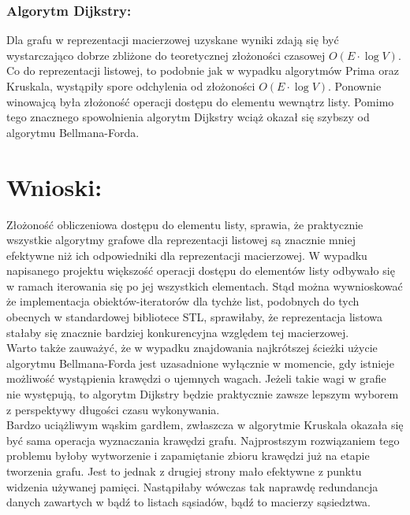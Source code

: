 \documentclass[a4paper,12pt]{article}
\begin{document}
\subsubsection{Algorytm Dijkstry:}
Dla grafu w reprezentacji macierzowej uzyskane wyniki zdają się być wystarczająco dobrze zbliżone do teoretycznej złożoności czasowej $O(E \cdot \log V)$. \\

\noindent
Co do reprezentacji listowej, to podobnie jak w wypadku algorytmów Prima oraz Kruskala, wystąpiły spore odchylenia od złożoności $O(E \cdot \log V)$. Ponownie winowajcą była złożoność operacji dostępu do elementu wewnątrz listy. Pomimo tego znacznego spowolnienia algorytm Dijkstry wciąż okazał się szybszy od algorytmu Bellmana-Forda.

\section{Wnioski:}
Złożoność obliczeniowa dostępu do elementu listy, sprawia, że praktycznie wszystkie algorytmy grafowe dla reprezentacji listowej są znacznie mniej efektywne niż ich odpowiedniki dla reprezentacji macierzowej. W wypadku napisanego projektu większość operacji dostępu do elementów listy odbywało się w ramach iterowania się po jej wszystkich elementach. Stąd można wywnioskować że implementacja obiektów-iteratorów dla tychże list, podobnych do tych obecnych w standardowej bibliotece STL, sprawiłaby, że reprezentacja listowa stałaby się znacznie bardziej konkurencyjna względem tej macierzowej.\\

\noindent
Warto także zauważyć, że w wypadku znajdowania najkrótszej ścieżki użycie algorytmu Bellmana-Forda jest uzasadnione wyłącznie w momencie, gdy istnieje możliwość wystąpienia krawędzi o ujemnych wagach. Jeżeli takie wagi w grafie nie występują, to algorytm Dijkstry będzie praktycznie zawsze lepszym wyborem z perspektywy długości czasu wykonywania.\\

\noindent
Bardzo uciążliwym wąskim gardłem, zwłaszcza w algorytmie Kruskala okazała się być sama operacja wyznaczania krawędzi grafu. Najprostszym rozwiązaniem tego problemu byłoby wytworzenie i zapamiętanie zbioru krawędzi już na etapie tworzenia grafu. Jest to jednak z drugiej strony mało efektywne z punktu widzenia używanej pamięci. Nastąpiłaby wówczas tak naprawdę redundancja danych zawartych w bądź to listach sąsiadów, bądź to macierzy sąsiedztwa.
\end{document}
